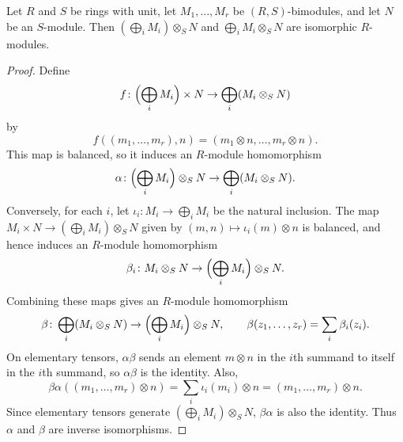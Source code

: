 \documentclass[../Odyssey_Project.tex]{subfiles}
\begin{document}
\begin{proposition}
\label{prop:12.3}
Let $R$ and $S$ be rings with unit, let $M_1, \ldots, M_r$ be $(R,S)$-bimodules, and let $N$ be an $S$-module. Then $(\bigoplus_i M_i) \otimes_S N$ and $\bigoplus_i M_i \otimes_S N$ are isomorphic $R$-modules.
\end{proposition}
\begin{proof}
    Define
    \[
        f \colon \Bigl(\bigoplus_i M_i\Bigr) \times N \to \bigoplus_i (M_i \otimes_S N)
    \]
    by
    \[
        f((m_1,\ldots,m_r),n) = (m_1 \otimes n,\ldots,m_r \otimes n).
    \]
    This map is balanced, so it induces an $R$-module homomorphism
    \[
        \alpha \colon \Bigl(\bigoplus_i M_i\Bigr) \otimes_S N \to \bigoplus_i (M_i \otimes_S N).
    \]
    Conversely, for each $i$, let $\iota_i \colon M_i \to \bigoplus_i M_i$ be the natural inclusion. The map $M_i \times N \to (\bigoplus_i M_i) \otimes_S N$ given by $(m,n) \mapsto \iota_i(m) \otimes n$ is balanced, and hence induces an $R$-module homomorphism
    \[
        \beta_i \colon M_i \otimes_S N \to \Bigl(\bigoplus_i M_i\Bigr) \otimes_S N.
    \]
    Combining these maps gives an $R$-module homomorphism
    \[
        \beta \colon \bigoplus_i (M_i \otimes_S N) \to \Bigl(\bigoplus_i M_i\Bigr) \otimes_S N,
        \qquad
        \beta(z_1,\ldots,z_r) = \sum_i \beta_i(z_i).
    \]
    On elementary tensors, $\alpha\beta$ sends an element $m \otimes n$ in the $i$th summand to itself in the $i$th summand, so $\alpha\beta$ is the identity. Also,
    \[
        \beta\alpha((m_1,\ldots,m_r) \otimes n)
        = \sum_i \iota_i(m_i) \otimes n
        = (m_1,\ldots,m_r) \otimes n.
    \]
    Since elementary tensors generate $(\bigoplus_i M_i) \otimes_S N$, $\beta\alpha$ is also the identity. Thus $\alpha$ and $\beta$ are inverse isomorphisms.
\end{proof}
\end{document}
